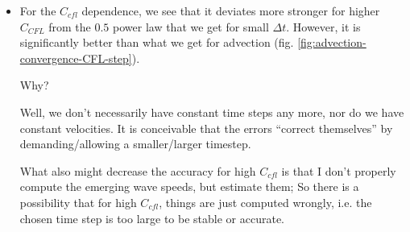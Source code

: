 \begin{itemize}
\begin{itemize}
			\item 	For the $C_{cfl}$ dependence, we see that it deviates more stronger for higher $C_{CFL}$ from the $0.5$ power law that we get for small $\Delta t$.
					However, it is significantly better than what we get for advection (fig. \ref{fig:advection-convergence-CFL-step}).
					
					Why?
					
					Well, we don't necessarily have constant time steps any more, nor do we have constant velocities.
					It is conceivable that the errors ``correct themselves'' by demanding/allowing a smaller/larger timestep.
					
					What also might decrease the accuracy for high $C_{cfl}$ is that I  don't properly compute the emerging wave speeds, but estimate them;
					So there is a possibility that for high $C_{cfl}$, things are just computed wrongly, i.e. the chosen time step is too large to be stable or accurate.
			
		\end{itemize}
\end{itemize}